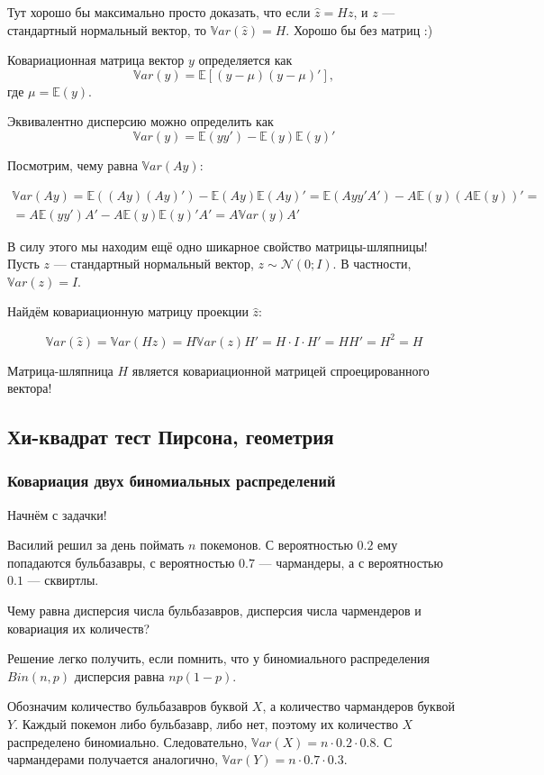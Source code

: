 \documentclass[11pt,russian,]{article}
\newcommand{\cN}{\mathcal{N}}
\newcommand{\E}{\mathbb{E}}
\newcommand{\1}{\mathbbm{1}}
\newcommand{\Var}{\mathbb{V}ar}
\begin{document}
Тут хорошо бы максимально просто доказать, что если \(\hat z = Hz\), и
\(z\) --- стандартный нормальный вектор, то \(\Var(\hat z) = H\). Хорошо
бы без матриц :)

Ковариационная матрица вектор \(y\) определяется как \[
\Var(y) = \E[(y-\mu)(y-\mu)'],
\] где \(\mu = \E(y)\).

Эквивалентно дисперсию можно определить как \[
\Var(y) = \E(yy')- \E(y)\E(y)'
\]

Посмотрим, чему равна \(\Var(Ay)\):

\begin{multline*}
\Var(Ay) = \E((Ay)(Ay)') - \E(Ay)\E(Ay)' = \E(Ayy'A') - A\E(y)(A\E(y))'= \\
= A\E(yy')A' - A\E(y)\E(y)'A'=A\Var(y)A'
\end{multline*}

В силу этого мы находим ещё одно шикарное свойство матрицы-шляпницы!
Пусть \(z\) --- стандартный нормальный вектор, \(z \sim \cN(0; I)\). В
частности, \(\Var(z) = I\).

Найдём ковариационную матрицу проекции \(\hat z\):

\[
\Var(\hat z) = \Var(Hz)=H\Var(z)H'=H\cdot I\cdot H'=HH'=H^2=H
\]

Матрица-шляпница \(H\) является ковариационной матрицей спроецированного
вектора!

\subsection{Хи-квадрат тест Пирсона, геометрия}\label{----}

\subsubsection{Ковариация двух биномиальных распределений}\label{---}

Начнём с задачки!

Василий решил за день поймать \(n\) покемонов. С вероятностью \(0.2\)
ему попадаются бульбазавры, с вероятностью \(0.7\) --- чармандеры, а с
вероятностью \(0.1\) --- сквиртлы.

Чему равна дисперсия числа бульбазавров, дисперсия числа чармендеров и
ковариация их количеств?

Решение легко получить, если помнить, что у биномиального распределения
\(Bin(n, p)\) дисперсия равна \(np(1-p)\).

Обозначим количество бульбазавров буквой \(X\), а количество чармандеров
буквой \(Y\). Каждый покемон либо бульбазавр, либо нет, поэтому их
количество \(X\) распределено биномиально. Следовательно,
\(\Var(X)=n \cdot 0.2 \cdot 0.8\). С чармандерами получается аналогично,
\(\Var(Y)= n \cdot 0.7 \cdot 0.3\).
\end{document}
